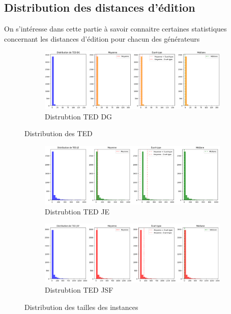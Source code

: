       \subsection{Distribution des distances d'édition}
        On s'intéresse dans cette partie à savoir connaitre certaines statistiques concernant les distances d'édition pour chacun des générateurs 
        \begin{figure}[H]
          \begin{subfigure}[t]{\linewidth}
            \includegraphics[scale=0.41]{Photos/ted_vs_errors/distribution_ted_dg.PNG}
            \caption{Distrubtion TED DG}
          \end{subfigure}
         
          \caption{Distribution des TED}
          \label{fig:distribution_ted}
        \end{figure}
        \begin{figure}[H]\ContinuedFloat
          \begin{subfigure}[t]{\linewidth}
            \includegraphics[scale=0.41]{Photos/ted_vs_errors/distribution_ted_je.PNG}
            \caption{Distrubtion TED JE} 
          \end{subfigure}
          \begin{subfigure}[t]{\linewidth}
            \includegraphics[scale=0.41]{Photos/ted_vs_errors/distribution_ted_jsf.PNG}
            \caption{Distrubtion TED JSF}
          \end{subfigure}
          \caption{Distribution des tailles des instances}
          \label{fig:distribution_tailles}
        \end{figure}


